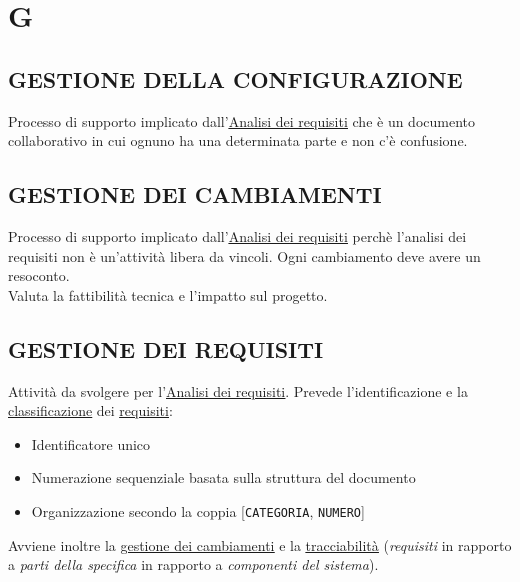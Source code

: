 \newpage
	\section{G} \label{sec:G}
		\subsection{GESTIONE DELLA CONFIGURAZIONE}  \label{gestioneconfigurazione}
		Processo di supporto implicato dall'\underline{\hyperref[analisideirequisiti]{Analisi dei requisiti}} che è un documento collaborativo in cui ognuno ha una determinata parte e non c'è confusione.

		\subsection{GESTIONE DEI CAMBIAMENTI}  \label{gestionecambiamenti}
		Processo di supporto implicato dall'\underline{\hyperref[analisideirequisiti]{Analisi dei requisiti}} perchè l'analisi dei requisiti non è un'attività libera da vincoli. Ogni cambiamento deve avere un resoconto. \\
		Valuta la fattibilità tecnica e l'impatto sul progetto.

		\subsection{GESTIONE DEI REQUISITI}	 \label{gestionerequisiti}
		Attività da svolgere per l'\underline{\hyperref[analisideirequisiti]{Analisi dei requisiti}}. Prevede l'identificazione e la \underline{\hyperref[classificazione]{classificazione}} dei \underline{\hyperref[requirements]{requisiti}}:
		\begin{itemize}
			\item Identificatore unico
			\item Numerazione sequenziale basata sulla struttura del documento
			\item Organizzazione secondo la coppia [\texttt{CATEGORIA}, \texttt{NUMERO}]
		\end{itemize}
		Avviene inoltre la \underline{\hyperref[gestionecambiamenti]{gestione dei cambiamenti}} e la \underline{\hyperref[tracciamento]{tracciabilità}} (\textit{requisiti} in rapporto a \textit{parti della specifica} in rapporto a \textit{componenti del sistema}).

